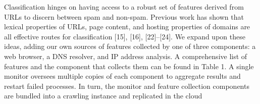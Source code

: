 Classification hinges on having access to a robust set of features derived from
URLs to discern between spam and non-spam. Previous work has shown that lexical
properties of URLs, page content, and hosting properties of domains are all
effective routes for classification [15], [16], [22]–[24]. We expand upon these
ideas, adding our own sources of features collected by one of three components:
a web browser, a DNS resolver, and IP address analysis. A comprehensive list of
features and the component that collects them can be found in Table 1. A single
monitor oversees multiple copies of each component to aggregate results and
restart failed processes. In turn, the monitor and feature collection components
are bundled into a crawling instance and replicated in the cloud


%
%
%                                       
%
%
%
%
%
%
%
%
%
%

